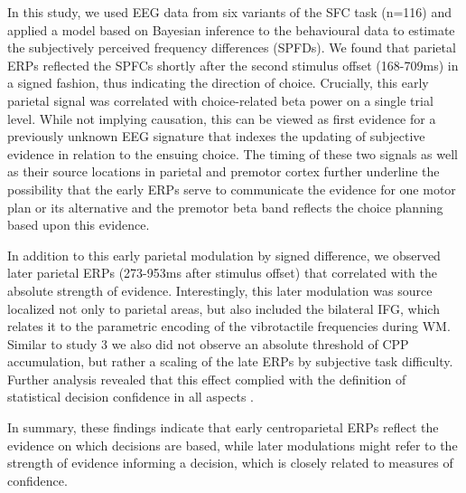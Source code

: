In this study, we used EEG data from six variants of the SFC task (n=116) and applied a model based on Bayesian inference to the behavioural data to estimate the subjectively perceived frequency differences (SPFDs). We found that parietal ERPs reflected the SPFCs shortly after the second stimulus offset (168-709ms) in a signed fashion, thus indicating the direction of choice. Crucially, this early parietal signal was correlated with choice-related beta power on a single trial level. While not implying causation, this can be viewed as first evidence for a previously unknown EEG signature that indexes the updating of subjective evidence in relation to the ensuing choice. The timing of these two signals as well as their source locations in parietal and premotor cortex further underline the possibility that the early ERPs serve to communicate the evidence for one motor plan or its alternative and the premotor beta band reflects the choice planning based upon this evidence.

In addition to this early parietal modulation by signed difference, we observed later parietal ERPs (273-953ms after stimulus offset) that correlated with the absolute strength of evidence. Interestingly, this later modulation was source localized not only to parietal areas, but also included the bilateral IFG, which relates it to the parametric encoding of the vibrotactile frequencies during WM. Similar to study 3 we also did not observe an absolute threshold of CPP accumulation, but rather a scaling of the late ERPs by subjective task difficulty. Further analysis revealed that this effect complied with the definition of statistical decision confidence in all aspects \parencite{Hangya2016,Sanders2016}. 

In summary, these findings indicate that early centroparietal ERPs reflect the evidence on which decisions are based, while later modulations might refer to the strength of evidence informing a decision, which is closely related to measures of confidence.

